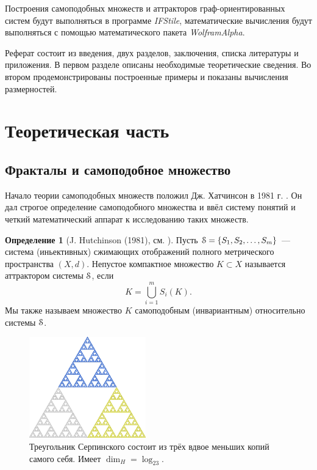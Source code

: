 \documentclass[a4paper,14pt]{extarticle} %
\newcommand{\eS}{\EuScript{S}}
\newcommand{\IN}{\subset}
\newcommand{\0}{\varnothing}
\newcommand{\8}{\infty}
\theoremstyle{definition}
\newtheorem{definition}[theorem]{Определение}
\begin{document}
Построения самоподобных множеств и аттракторов граф-ори\-ен\-ти\-ро\-ван\-ных систем будут выполняться в программе {\em IFStile\/}, математические вычисления будут выполняться с помощью математического пакета {\em WolframAlpha}.

Реферат состоит из введения, двух разделов, заключения, списка литературы и
приложения.
В первом разделе описаны необходимые теоретические сведения.
Во втором продемонстрированы построенные примеры и показаны вычисления размерностей.


\newpage
\section{Теоретическая часть}

\subsection{Фракталы и самоподобное множество}

Начало теории самоподобных множеств положил Дж. Хатчинсон в 1981 г. \cite{Hut1981}.
Он дал строгое определение самоподобного множества и ввёл систему понятий и четкий математический аппарат к исследованию таких множеств. 

\begin{definition}[J. Hutchinson (1981), см. {\cite{Hut1981}}]\label{dfn:sss}
Пусть $\eS=\{S_1, S_2, \ldots, S_m\}$ ---  система (иньективных) сжимающих отображений полного метрического пространства $(X, d)$.
Непустое компактное множество $K\IN X$ называется аттрактором системы $\eS$, если 
$$K = \bigcup \limits_{i=1}^m S_i (K).$$
Мы также называем множество $K$ самоподобным (инвариантным) относительно системы $\eS$.
\end{definition} 

\begin{figure}[H]
\centering
\includegraphics[width=0.45\textwidth]{Triangle_Serp.png}
\begin{minipage}{0.85\textwidth}
\caption{Треугольник Серпинского состоит из трёх вдвое меньших копий самого себя. Имеет $\dim_H=\log_23$.}
\label{fig:serptr}
\end{minipage}
\end{figure}
\end{document}
